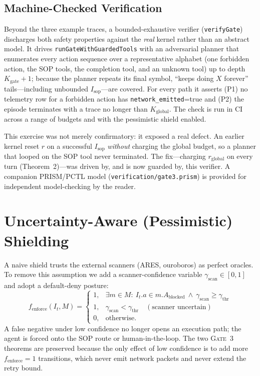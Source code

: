 \documentclass{article}
\theoremstyle{plain}
\theoremstyle{definition}
\begin{document}
\subsection{Machine-Checked Verification}
\label{sec:verification}
Beyond the three example traces, a bounded-exhaustive verifier
(\texttt{verifyGate}) discharges both safety properties against the \emph{real}
kernel rather than an abstract model. It drives \texttt{runGateWithGuardedTools}
with an adversarial planner that enumerates every action sequence over a
representative alphabet (one forbidden action, the SOP tools, the completion
tool, and an unknown tool) up to depth $K_{\text{gate}}+1$; because the planner
repeats its final symbol, ``keeps doing $X$ forever'' tails---including unbounded
$I_{\text{sop}}$---are covered. For every path it asserts (P1) no telemetry row
for a forbidden action has \texttt{network\_emitted}=true and (P2) the episode
terminates with a trace no longer than $K_{\text{global}}$. The check is run in
CI across a range of budgets and with the pessimistic shield enabled.

This exercise was not merely confirmatory: it exposed a real defect. An earlier
kernel reset $r$ on a successful $I_{\text{sop}}$ \emph{without} charging the
global budget, so a planner that looped on the SOP tool never terminated. The
fix---charging $r_{\text{global}}$ on every turn (Theorem~2)---was driven by, and
is now guarded by, this verifier. A companion PRISM/PCTL model
(\texttt{verification/gate3.prism}) is provided for independent model-checking by
the reader.

\section{Uncertainty-Aware (Pessimistic) Shielding}
\label{sec:uncertainty}
A naive shield trusts the external scanners (ARES, ouroboros) as perfect
oracles. To remove this assumption we add a scanner-confidence variable
$\gamma_{\text{scan}}\in[0,1]$ and adopt a default-deny posture:
\begin{equation}
f_{\text{enforce}}(I_t,M)=
\begin{cases}
1, & \exists m\in M:\ I_t.a\in m.A_{\text{blocked}}\ \wedge\ \gamma_{\text{scan}}\ge\gamma_{\text{thr}}\\
1, & \gamma_{\text{scan}}<\gamma_{\text{thr}}\quad(\text{scanner uncertain})\\
0, & \text{otherwise.}
\end{cases}
\end{equation}
A false negative under low confidence no longer opens an execution path; the
agent is forced onto the SOP route or human-in-the-loop. The two \textsc{Gate~3}
theorems are preserved because the only effect of low confidence is to add more
$f_{\text{enforce}}=1$ transitions, which never emit network packets and never
extend the retry bound.
\end{document}
